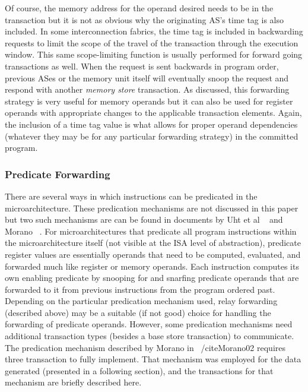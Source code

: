 \documentclass[10pt,dvips]{article}
\begin{document}
%
Of course, the memory address for the operand desired
needs to be in the transaction but it is not as obvious why
the originating AS's time tag is also included.  In some
interconnection fabrics, the time tag is included in backwarding
requests to limit the scope of the travel of the transaction
through the execution window.  This same scope-limiting function
is usually performed for forward going transactions as well.
When the request is sent backwards in program order, previous
ASes or the memory unit itself will eventually snoop
the request and respond with another \textit{memory store}
transaction.
As discussed, this forwarding strategy is very useful for memory
operands but it can also be used for register operands with
appropriate changes to the applicable transaction elements.
Again, the inclusion of a time tag value is what allows
for proper operand dependencies (whatever they may be for
any particular forwarding strategy) in the committed program.
%
\subsubsection{Predicate Forwarding}
%
There are several ways in which instructions can be predicated
in the microarchitecture.  
These predication mechanisms are not discussed in
this paper but two such mechanisms are can be found in
documents by Uht et al ~\cite{Uht01} and Morano ~\cite{Morano02}.
For microarchitectures that predicate all program instructions
within the microarchitecture itself (not visible at the ISA
level of abstraction), predicate register values are essentially
operands that need to be computed, evaluated, and forwarded
much like register or memory operands.
Each instruction computes its own enabling predicate by
snooping for and snarfing predicate operands that are forwarded
to it from previous instructions from the program ordered past.
Depending on the particular predication mechanism used,
relay forwarding (described above) may be a suitable (if not good) choice 
for handling the forwarding of predicate operands.
However, some predication mechanisms need additional transaction
types (besides a base store transaction) to communicate.
The predication mechanism described by Morano in ~/cite{Morano02}
requires three transaction to fully implement.
That mechanism was employed for the data generated (presented in
a following section), and the transactions for that mechanism
are briefly described here.
\end{document}
